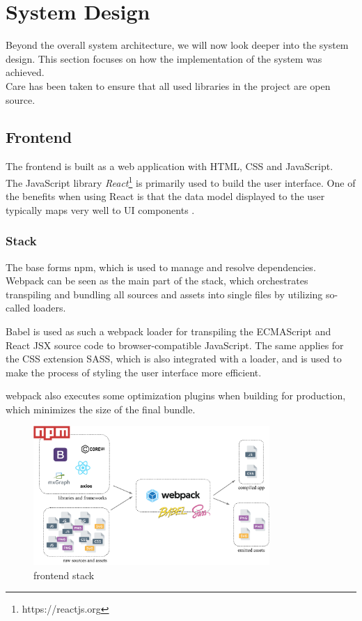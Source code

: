 \documentclass[a4paper,top=25mm,bottom=25mm,12pt,pdftex,halfparskip,twoside,openany,bibtotoc,numbers=noenddot]{scrbook}
\begin{document}
\clearpage

\section{System Design}

Beyond the overall system architecture, we will now look deeper into the system design.
This  section  focuses on how the implementation of the system was achieved.\\
Care has been taken to ensure that all used libraries in the project are open source.

\subsection{Frontend}

The frontend is built as a web application with HTML, CSS and JavaScript.\\
The JavaScript library \textit{React}\footnote{https://reactjs.org} is primarily used to build the user interface. One of the benefits when using React is that the data model displayed to the user typically maps very well to UI components \cite{online-react-thinking-in-react}.

\subsubsection{Stack}

The base forms npm, which is used to manage and resolve dependencies.  Webpack can be seen as the main part of the stack, which orchestrates transpiling and bundling all sources and assets into single files by utilizing so-called loaders.

Babel is used as such a webpack loader for transpiling the ECMAScript and React JSX source code to browser-compatible JavaScript.
The same applies for the CSS extension SASS, which is also integrated with a loader, and is used to make the process of styling the user interface more efficient.

webpack also executes some optimization plugins when building for production, which minimizes the size of the final bundle.

\begin{figure}[H]
  \centering
  \vspace{0.8cm}
  \includegraphics[width=0.8\textwidth]{frontend-setup}
  \caption{frontend stack}
\end{figure}
\end{document}

